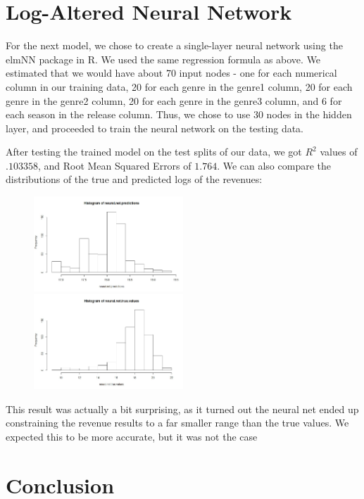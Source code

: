 \documentclass{article}
\begin{document}
\section*{Log-Altered Neural Network}
\vspace{0.2in}

For the next model, we chose to create a single-layer neural network using the elmNN package in R. We used the same regression formula as above.  We estimated that we would have about 70 input nodes - one for each numerical column in our training data, 20 for each genre in the genre1 column, 20 for each genre in the genre2 column, 20 for each genre in the genre3 column, and 6 for each season in the release column.  Thus, we chose to use 30 nodes in the hidden layer, and proceeded to train the neural network on the testing data.

After testing the trained model on the test splits of our data, we got $R^2$ values of $.103358$, and Root Mean Squared Errors of $1.764$.  We can also compare the distributions of the true and predicted logs of the revenues:

\begin{figure}[ht]
\includegraphics[width = 0.5\textwidth]{nnp.jpeg}
\includegraphics[width = 0.5\textwidth]{nntv.jpeg}
\end{figure}

This result was actually a bit surprising, as it turned out the neural net ended up constraining the revenue results to a far smaller range than the true values.  We expected this to be more accurate, but it was not the case

\section*{Conclusion}
\vspace{0.2in}
\end{document}
